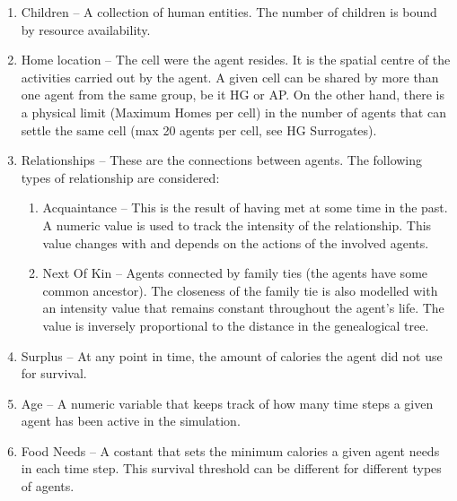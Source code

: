 \begin{enumerate}
\item Children – A collection of human entities. The number of children is bound by resource
availability.
\item Home location – The cell were the agent resides. It is the spatial centre of the activities
carried out by the agent. A given cell can be shared by more than one agent from the same
group, be it HG or AP. On the other hand, there is a physical limit (Maximum Homes per
cell) in the number of agents that can settle the same cell (max 20 agents per cell, see HG
Surrogates).
\item Relationships – These are the connections between agents. The following types of
relationship are considered:\\
	\begin{enumerate}
 
	\item Acquaintance – This is the result of having met at some time in the past. A numeric
	value is used to track the intensity of the relationship. This value changes with and
	depends on the actions of the involved agents.\\
	\item Next Of Kin – Agents connected by family ties (the agents have some common
	ancestor). The closeness of the family tie is also modelled with an intensity value that
	remains constant throughout the agent's life. The value is inversely proportional to the
	distance in the genealogical tree.

	\end{enumerate}

\item Surplus – At any point in time, the amount of calories the agent did not use for survival.
\item Age – A numeric variable that keeps track of how many time steps a given agent has been
active in the simulation.
\item Food Needs – A costant that sets the minimum calories a given agent needs in each time
step. This survival threshold can be different for different types of agents.
\end{enumerate}

